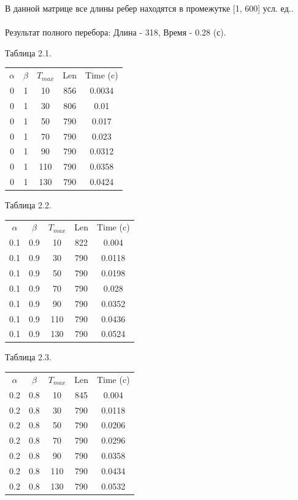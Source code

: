 \documentclass[12pt]{report}
\begin{document}
	В данной матрице все длины ребер находятся в промежутке [1, 600] усл. ед..
	~\\
	~\\
	Результат полного перебора: Длина - 318, Время - 0.28 (с).
	
	\newpage
	
	\begin{minipage}{0.5\textwidth}
		\begin{center}
			Таблица 2.1.
			
			\begin{tabular}{|c c c c c|}
				\hline
				$\alpha$ & $\beta$ & $T_{max}$ & Len & Time (c) \\ [0.5ex]
				0 & 1 & 10 & 856 & 0.0034 \\ 
				\hline 
				0 & 1 & 30 & 806 & 0.01 \\ 
				\hline 
				0 & 1 & 50 & 790 & 0.017 \\ 
				\hline 
				0 & 1 & 70 & 790 & 0.023 \\ 
				\hline 
				0 & 1 & 90 & 790 & 0.0312 \\ 
				\hline 
				0 & 1 & 110 & 790 & 0.0358 \\ 
				\hline 
				0 & 1 & 130 & 790 & 0.0424 \\ 
				\hline 
			\end{tabular}
			
			Таблица 2.2.
			
			\begin{tabular}{|c c c c c|}
				\hline
				$\alpha$ & $\beta$ & $T_{max}$ & Len & Time (c) \\ [0.5ex]
				0.1 & 0.9 & 10 & 822 & 0.004 \\ 
				\hline 
				0.1 & 0.9 & 30 & 790 & 0.0118 \\ 
				\hline 
				0.1 & 0.9 & 50 & 790 & 0.0198 \\ 
				\hline 
				0.1 & 0.9 & 70 & 790 & 0.028 \\ 
				\hline 
				0.1 & 0.9 & 90 & 790 & 0.0352 \\ 
				\hline 
				0.1 & 0.9 & 110 & 790 & 0.0436 \\ 
				\hline 
				0.1 & 0.9 & 130 & 790 & 0.0524 \\ 
				\hline 
			\end{tabular}
			
			Таблица 2.3.
			
			\begin{tabular}{|c c c c c|}
				\hline
				$\alpha$ & $\beta$ & $T_{max}$ & Len & Time (c) \\ [0.5ex]
				0.2 & 0.8 & 10 & 845 & 0.004 \\ 
				\hline 
				0.2 & 0.8 & 30 & 790 & 0.0118 \\ 
				\hline 
				0.2 & 0.8 & 50 & 790 & 0.0206 \\ 
				\hline 
				0.2 & 0.8 & 70 & 790 & 0.0296 \\ 
				\hline 
				0.2 & 0.8 & 90 & 790 & 0.0358 \\ 
				\hline 
				0.2 & 0.8 & 110 & 790 & 0.0434 \\ 
				\hline 
				0.2 & 0.8 & 130 & 790 & 0.0532 \\ 
				\hline 
			\end{tabular}
			

\end{center}
\end{minipage}
\end{document}
